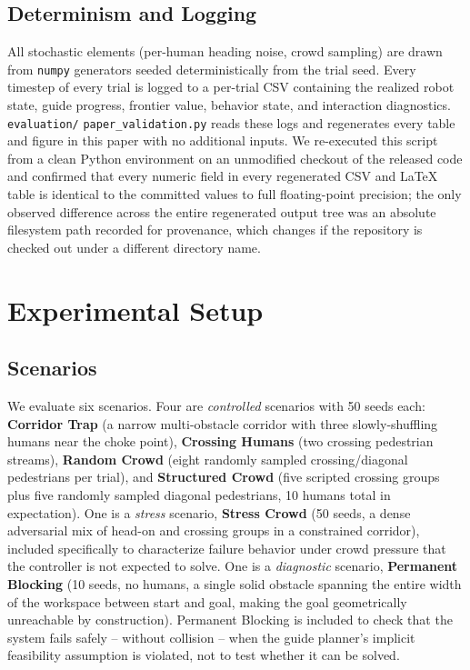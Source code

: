 \documentclass[conference,letterpaper,10pt]{ieeeconf}
\begin{document}
\subsection{Determinism and Logging}
\label{sec:repro}
All stochastic elements (per-human heading noise, crowd sampling) are
drawn from \texttt{numpy} generators seeded deterministically from the
trial seed. Every timestep of every trial is logged to a per-trial CSV
containing the realized robot state, guide progress, frontier value,
behavior state, and interaction diagnostics. \texttt{evaluation/}
\texttt{paper\_validation.py} reads these logs and regenerates every table
and figure in this paper with no additional inputs. We re-executed this
script from a clean Python environment on an unmodified checkout of the
released code and confirmed that every numeric field in every regenerated
CSV and \LaTeX{} table is identical to the committed values to full
floating-point precision; the only observed difference across the entire
regenerated output tree was an absolute filesystem path recorded for
provenance, which changes if the repository is checked out under a
different directory name.

\section{Experimental Setup}
\label{sec:setup}

\subsection{Scenarios}
We evaluate six scenarios. Four are \emph{controlled} scenarios with 50
seeds each: \textbf{Corridor Trap} (a narrow multi-obstacle corridor with
three slowly-shuffling humans near the choke point), \textbf{Crossing
Humans} (two crossing pedestrian streams), \textbf{Random Crowd} (eight
randomly sampled crossing/diagonal pedestrians per trial), and
\textbf{Structured Crowd} (five scripted crossing groups plus five
randomly sampled diagonal pedestrians, 10 humans total in expectation).
One is a \emph{stress} scenario, \textbf{Stress Crowd} (50 seeds, a dense
adversarial mix of head-on and crossing groups in a constrained corridor),
included specifically to characterize failure behavior under crowd
pressure that the controller is not expected to solve. One is a
\emph{diagnostic} scenario, \textbf{Permanent Blocking} (10 seeds, no
humans, a single solid obstacle spanning the entire width of the
workspace between start and goal, making the goal geometrically
unreachable by construction). Permanent Blocking is included to check
that the system fails safely -- without collision -- when the guide
planner's implicit feasibility assumption is violated, not to test
whether it can be solved.
\end{document}
